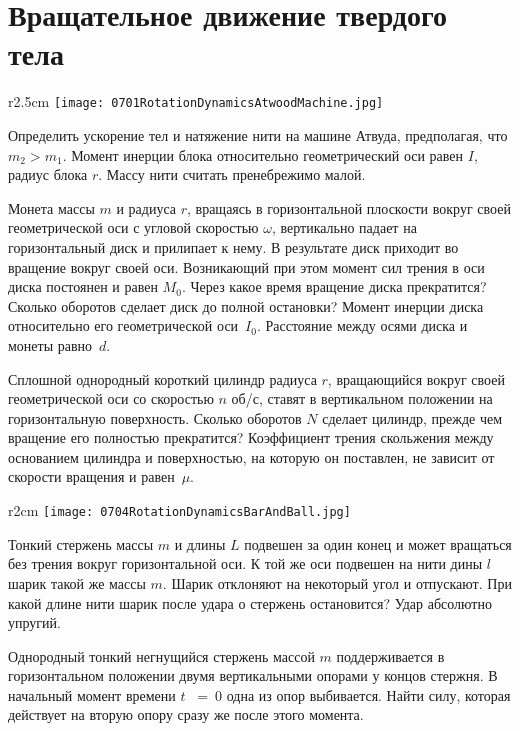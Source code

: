 \section{Вращательное движение твердого тела}

\begin{wrapfigure}{r}{2.5cm}
\texttt{[image: 0701RotationDynamicsAtwoodMachine.jpg]}
\end{wrapfigure}

\AddProb Определить ускорение тел и натяжение нити на машине Атвуда, предполагая, что $m_2>m_1$. 
Момент инерции блока относительно геометрический оси равен $I$, радиус блока $r$. Массу нити считать пренебрежимо малой. 

\AddProb Монета массы $m$ и радиуса $r$, вращаясь в горизонтальной плоскости вокруг своей геометрической оси с угловой скоростью $\omega$, 
вертикально падает на горизонтальный диск и прилипает к нему. В результате диск приходит во вращение вокруг своей оси. 
Возникающий при этом момент сил трения в оси диска постоянен и равен $M_0$. Через какое время вращение диска прекратится? 
Сколько оборотов сделает диск до полной остановки? Момент инерции диска относительно его геометрической оси~$I_0$. 
Расстояние между осями диска и монеты равно~$d$.

\AddProb Сплошной однородный короткий цилиндр радиуса $r$, вращающийся вокруг своей геометрической оси со скоростью $n$ об/с, 
ставят в вертикальном положении на горизонтальную поверхность. Сколько оборотов $N$ сделает цилиндр, прежде чем вращение его полностью прекратится? 
Коэффициент трения скольжения между основанием цилиндра и поверхностью, на которую он поставлен, не зависит от скорости вращения и равен~$\mu$.

\begin{wrapfigure}{r}{2cm}
\texttt{[image: 0704RotationDynamicsBarAndBall.jpg]}
\end{wrapfigure}

\AddProb Тонкий стержень массы $m$ и длины $L$ подвешен за один конец и может вращаться без трения вокруг горизонтальной оси. 
К той же оси подвешен на нити дины $l$ шарик такой же массы $m$. Шарик отклоняют на некоторый угол и отпускают. 
При какой длине нити шарик после удара о стержень остановится? Удар абсолютно упругий.

\AddProb Однородный тонкий негнущийся стержень массой $m$ поддерживается в горизонтальном положении двумя вертикальными опорами у концов стержня. 
В начальный момент времени $t$~ =~0 одна из опор выбивается. Найти силу, которая действует на вторую опору сразу же после этого момента.

